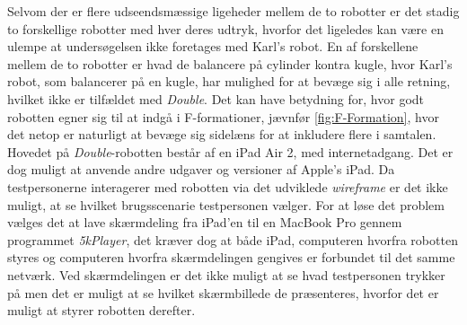 Selvom der er flere udseendsmæssige ligeheder mellem de to robotter er det stadig to forskellige robotter med hver deres udtryk, hvorfor det ligeledes kan være en ulempe at undersøgelsen ikke foretages med Karl's robot. En af forskellene mellem de to robotter er hvad de balancere på cylinder kontra kugle, hvor Karl's robot, som balancerer på en kugle, har mulighed for at bevæge sig i alle retning, hvilket ikke er tilfældet med \textit{Double}. Det kan have betydning for, hvor godt robotten egner sig til at indgå i F-formationer, jævnfør \autoref{fig:F-Formation}, hvor det netop er naturligt at bevæge sig sidelæns for at inkludere flere i samtalen.\blankline
%
Hovedet på \textit{Double}-robotten består af en iPad Air 2, med internetadgang. Det er dog muligt at anvende andre udgaver og versioner af Apple's iPad. Da testpersonerne interagerer med robotten via det udviklede \textit{wireframe} er det ikke muligt, at se hvilket brugsscenarie testpersonen vælger. For at løse det problem vælges det at lave skærmdeling fra iPad'en til en MacBook Pro gennem programmet \textit{5kPlayer}, det kræver dog at både iPad, computeren hvorfra robotten styres og computeren hvorfra skærmdelingen gengives er forbundet til det samme netværk. Ved skærmdelingen er det ikke muligt at se hvad testpersonen trykker på men det er muligt at se hvilket skærmbillede de præsenteres, hvorfor det er muligt at styrer robotten derefter. 

